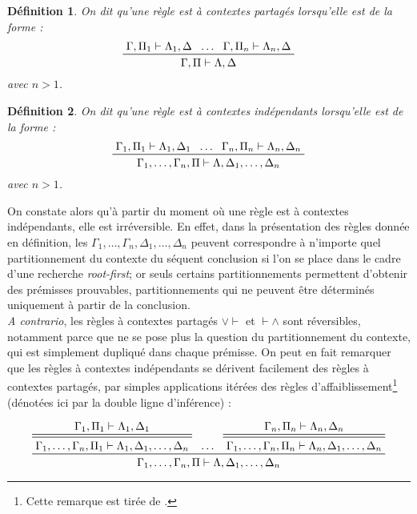 \documentclass[12pt]{report}
\newcommand{\seq}{\vdash}
\newcommand{\irule}[1]{\footnotesize$#1$}
\newcommand{\iruleL}[1]{\irule{{#1}\seq}}
\newcommand{\iruleR}[1]{\irule{\seq{#1}}}
\newtheorem{definition}{Définition}
\begin{document}
\begin{definition}
    On dit qu'une règle est \emph{à contextes partagés} lorsqu'elle est de la forme :
    \begin{displaymath}
        \prftree
            {\Gamma,\Pi_1 \seq \Lambda_1,\Delta}
            {\ldots}
            {\Gamma,\Pi_n \seq \Lambda_n,\Delta}
            {\Gamma,\Pi \seq \Lambda,\Delta}
    \end{displaymath}
    avec $n > 1$.
\end{definition}

\begin{definition}
    On dit qu'une règle est \emph{à contextes indépendants} lorsqu'elle est de la forme :
    \begin{displaymath}
        \prftree
            {\Gamma_1,\Pi_1 \seq \Lambda_1,\Delta_1}
            {\ldots}
            {\Gamma_n,\Pi_n \seq \Lambda_n,\Delta_n}
            {\Gamma_1,\ldots,\Gamma_n,\Pi \seq \Lambda,\Delta_1,\ldots,\Delta_n}
    \end{displaymath}
    avec $n > 1$.
\end{definition}

On constate alors qu'à partir du moment où une règle est à contextes indépendants, elle est irréversible. En effet, dans la présentation des règles donnée en définition, les $\Gamma_1,\ldots,\Gamma_n,\Delta_1,\ldots,\Delta_n$ peuvent correspondre à n'importe quel partitionnement du contexte du séquent conclusion si l'on se place dans le cadre d'une recherche \emph{root-first}; or seuls certains partitionnements permettent d'obtenir des prémisses prouvables, partitionnements qui ne peuvent être déterminés uniquement à partir de la conclusion.\\

\emph{A contrario}, les règles à contextes partagés {\iruleL{\lor}} et {\iruleR{\land}} sont réversibles, notamment parce que ne se pose plus la question du partitionnement du contexte, qui est simplement dupliqué dans chaque prémisse. On peut en fait remarquer que les règles à contextes indépendants se dérivent facilement des règles à contextes partagés, par simples applications itérées des règles d'affaiblissement\footnote{Cette remarque est tirée de \cite{Cur05}.} (dénotées ici par la double ligne d'inférence) :

\begin{displaymath}
    \prftree
        {\prftree[d]
            {\Gamma_1,\Pi_1 \seq \Lambda_1,\Delta_1}
            {\Gamma_1,\ldots,\Gamma_n,\Pi_1 \seq \Lambda_1,\Delta_1,\ldots,\Delta_n}}
        {\ldots}
        {\prftree[d]
            {\Gamma_n,\Pi_n \seq \Lambda_n,\Delta_n}
            {\Gamma_1,\ldots,\Gamma_n,\Pi_n \seq \Lambda_n,\Delta_1,\ldots,\Delta_n}}
        {\Gamma_1,\ldots,\Gamma_n,\Pi \seq \Lambda,\Delta_1,\ldots,\Delta_n}
\end{displaymath}
\end{document}
